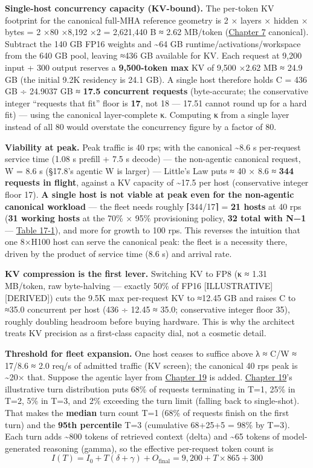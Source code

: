 \textbf{Single-host concurrency capacity (KV-bound).} The per-token KV
footprint for the canonical full-MHA reference geometry is 2 × layers ×
hidden × bytes = 2 ×80 ×8,192 ×2 = 2,621,440 B ≈ 2.62 MB/token (\hyperref[chap:7]{Chapter 7} canonical). Subtract the 140 GB FP16 weights and \textasciitilde64 GB
runtime/activations/workspace from the 640 GB pool, leaving ≈436 GB
available for KV. Each request at 9,200 input + 300 output reserves a
\textbf{9,500-token max} KV of 9,500 ×2.62 MB ≈ 24.9 GB (the initial
9.2K residency is 24.1 GB). A single host therefore holds C = 436 GB ÷
24.9037 GB ≈ \textbf{17.5 concurrent requests} (byte-accurate; the
conservative integer ``requests that fit'' floor is \textbf{17}, not 18
--- 17.51 cannot round up for a hard fit) --- using the canonical
layer-complete κ. Computing κ from a single layer instead of all 80
would overstate the concurrency figure by a factor of 80.

\textbf{Viability at peak.} Peak traffic is 40 rps; with the canonical
\textasciitilde8.6 s per-request service time (1.08 s prefill + 7.5 s
decode) --- the non-agentic canonical request, W = 8.6 s (§17.8's
agentic W is larger) --- Little's Law puts ≈ 40 × 8.6 ≈ \textbf{344
requests in flight}, against a KV capacity of \textasciitilde17.5 per
host (conservative integer floor 17). \textbf{A single host is not
viable at peak even for the non-agentic canonical workload} --- the
fleet needs roughly ⌈344/17⌉ = \textbf{21 hosts} at 40 rps (\textbf{31
working hosts} at the 70\% × 95\% provisioning policy, \textbf{32 total
with N−1} --- \hyperref[tab:17.1]{Table 17-1}), and more for growth to 100 rps. This reverses
the intuition that one 8×H100 host can serve the canonical peak: the
fleet is a necessity there, driven by the product of service time (8.6
s) and arrival rate.

\textbf{KV compression is the first lever.} Switching KV to FP8 (κ ≈
1.31 MB/token, raw byte-halving --- exactly 50\% of FP16
\mbox{{[}ILLUSTRATIVE{]}}\hspace{0pt}\mbox{{[}DERIVED{]}}) cuts the 9.5K max per-request KV to
≈12.45 GB and raises C to ≈35.0 concurrent per host (436 ÷ 12.45 ≈ 35.0;
conservative integer floor 35), roughly doubling headroom before buying
hardware. This is why the architect treats KV precision as a first-class
capacity dial, not a cosmetic detail.

\textbf{Threshold for fleet expansion.} One host ceases to suffice above
λ ≈ C/W ≈ 17/8.6 ≈ 2.0 req/s of admitted traffic (KV screen); the
canonical 40 rps peak is \textasciitilde20× that. Suppose the agentic
layer from \hyperref[chap:19]{Chapter 19} is added. \hyperref[chap:19]{Chapter 19}'s illustrative turn
distribution puts 68\% of requests terminating in T=1, 25\% in T=2, 5\%
in T=3, and 2\% exceeding the turn limit (falling back to single-shot).
That makes the \textbf{median} turn count T=1 (68\% of requests finish
on the first turn) and the \textbf{95th percentile} T=3 (cumulative
68+25+5 = 98\% by T=3). Each turn adds \textasciitilde800 tokens of
retrieved context (delta) and \textasciitilde65 tokens of
model-generated reasoning (gamma), so the effective per-request token
count is \[
I(T) = I_0 + T(\delta + \gamma) + O_\text{final} = 9{,}200 + T \times 865 + 300
\]

